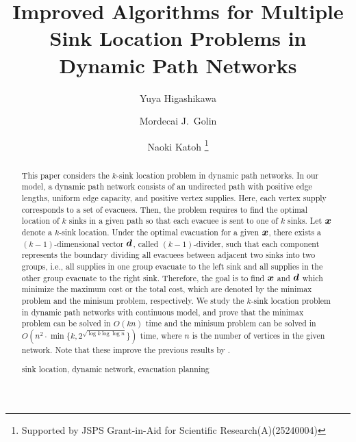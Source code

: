 \documentclass[a4paper]{llncs}
\newcommand{\keywords}[1]{\par\addvspace\baselineskip
\noindent\keywordname\enspace\ignorespaces#1}
\newcommand{\bm}[1]{\mbox{\boldmath{$#1$}}}
\begin{document}
\mainmatter

\title{Improved Algorithms for Multiple Sink Location Problems in Dynamic Path Networks}

\author{
Yuya Higashikawa 
\and Mordecai J.~Golin 
\and Naoki Katoh  \thanks{Supported by JSPS Grant-in-Aid for Scientific Research(A)(25240004)}
}



\maketitle


\begin{abstract}
This paper considers the $k$-sink location problem in dynamic path networks.
In our model, a dynamic path network consists of an undirected path with positive edge lengths, uniform edge capacity, and positive vertex supplies.
Here, each vertex supply corresponds to a set of evacuees.
Then, the problem requires to find the optimal location of $k$ sinks in a given path so that each evacuee is sent to one of $k$ sinks.
Let ${\bm x}$ denote a $k$-sink location.
Under the optimal evacuation for a given ${\bm x}$, 
there exists a $(k-1)$-dimensional vector ${\bm d}$, called $(k-1)$-divider, 
such that each component represents the boundary dividing all evacuees between adjacent two sinks into two groups, 
i.e., all supplies in one group evacuate to the left sink and all supplies in the other group evacuate to the right sink.
Therefore, the goal is to find ${\bm x}$ and ${\bm d}$ which minimize the maximum cost or the total cost,
which are denoted by the minimax problem and the minisum problem, respectively.
We study the $k$-sink location problem in dynamic path networks with continuous model,
and prove that the minimax problem can be solved in $O(kn)$ time and the minisum problem can be solved in $O(n^2 \cdot \min \{ k, 2^{\sqrt{\log k \log \log n}}\})$ time,
where $n$ is the number of vertices in the given network.
Note that these improve the previous results by \cite{hgk14_2}.
\keywords{sink location, dynamic network, evacuation planning}
\end{abstract}
\end{document}

